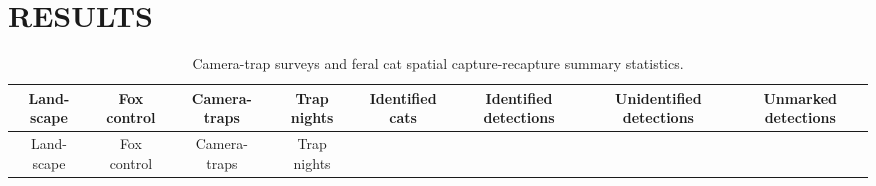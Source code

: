 \documentclass[]{elsarticle} %
\begin{document}
\newpage

\hypertarget{results}{%
\section{RESULTS}\label{results}}

\begin{longtable}[]{@{}cccccccc@{}}
\caption{\label{tab:sstab} Camera-trap surveys and feral cat spatial capture-recapture summary statistics.}\tabularnewline
\toprule
\begin{minipage}[b]{0.07\columnwidth}\centering
Land- scape\strut
\end{minipage} & \begin{minipage}[b]{0.07\columnwidth}\centering
Fox control\strut
\end{minipage} & \begin{minipage}[b]{0.08\columnwidth}\centering
Camera- traps\strut
\end{minipage} & \begin{minipage}[b]{0.07\columnwidth}\centering
Trap nights\strut
\end{minipage} & \begin{minipage}[b]{0.10\columnwidth}\centering
Identified cats\strut
\end{minipage} & \begin{minipage}[b]{0.13\columnwidth}\centering
Identified detections\strut
\end{minipage} & \begin{minipage}[b]{0.14\columnwidth}\centering
Unidentified detections\strut
\end{minipage} & \begin{minipage}[b]{0.12\columnwidth}\centering
Unmarked detections\strut
\end{minipage}\tabularnewline
\midrule
\endfirsthead
\toprule
\begin{minipage}[b]{0.07\columnwidth}\centering
Land- scape\strut
\end{minipage} & \begin{minipage}[b]{0.07\columnwidth}\centering
Fox control\strut
\end{minipage} & \begin{minipage}[b]{0.08\columnwidth}\centering
Camera- traps\strut
\end{minipage} & \begin{minipage}[b]{0.07\columnwidth}\centering
Trap nights\strut
\end{minipage} & \begin{minipage}[b]{0.10\columnwidth}\centering

\end{minipage}
\end{longtable}
\end{document}
